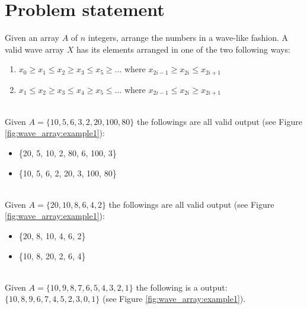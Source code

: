 \section{Problem statement}
\begin{exercise}
\label{ex:wave_array:statement}

Given an array $A$ of $n$ integers, arrange the numbers in a wave-like fashion. A valid wave array $X$ has its elements arranged in one of the two following ways:
	\begin{enumerate}
		\item  $x_0 \geq x_1 \leq x_2 \geq x_3 \leq  x_5 \geq \ldots$ where $x_{2i-1} \geq x_{2i} \leq x_{2i+1}$
		\item  $x_1 \leq x_2 \geq x_3 \leq x_4 \geq x_5 \leq \ldots$ where $x_{2i-1} \leq x_{2i} \geq x_{2i+1}$
	\end{enumerate}


	\begin{example}
		\hfill \\
		\label{ex:wave_array:example1}
		Given $A= \{10, 5, 6, 3, 2, 20, 100, 80\}$ the followings are all valid output (see Figure \ref{fig:wave_array:example1}):
		\begin{itemize}
			\item  \{20, 5, 10, 2, 80, 6, 100, 3\}
			\item  \{10, 5, 6, 2, 20, 3, 100, 80\}
		\end{itemize}
	\end{example}

	\begin{example}
		\hfill \\
		\label{ex:wave_array:example2}
		Given $A= \{20, 10, 8, 6, 4, 2\}$ the followings are all valid output (see Figure \ref{fig:wave_array:example1}):
		\begin{itemize}
			\item \{20, 8, 10, 4, 6, 2\}
			\item  \{10, 8, 20, 2, 6, 4\}
		\end{itemize}
		
	\end{example}

	\begin{example}
		\hfill \\
		\label{ex:wave_array:example3}
		Given $A= \{10,9,8,7,6,5,4,3,2,1\}$ the following is a output: $\{10, 8, 9, 6, 7, 4, 5, 2, 3, 0,
		1 \}$ (see Figure \ref{fig:wave_array:example1}).
		
	\end{example}
\end{exercise}


